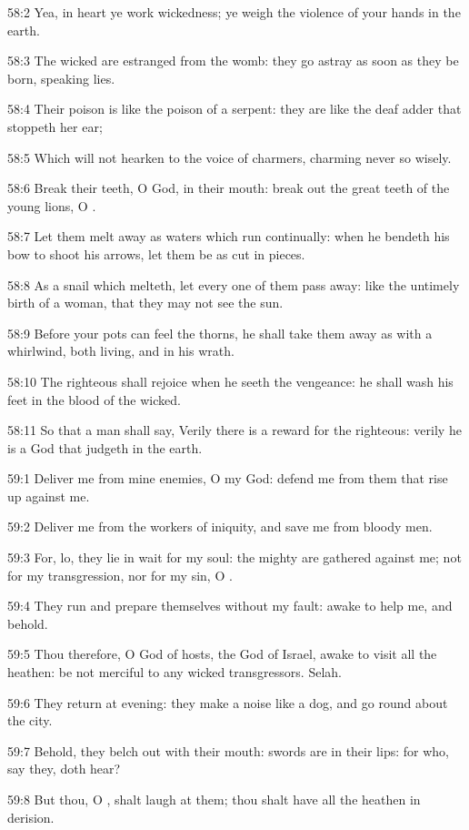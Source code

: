 58:2 Yea, in heart ye work wickedness; ye weigh the violence of your hands in the earth.

58:3 The wicked are estranged from the womb: they go astray as soon as they be born, speaking lies.

58:4 Their poison is like the poison of a serpent: they are like the deaf adder that stoppeth her ear;

58:5 Which will not hearken to the voice of charmers, charming never so wisely.

58:6 Break their teeth, O God, in their mouth: break out the great teeth of the young lions, O \LORD.

58:7 Let them melt away as waters which run continually: when he bendeth his bow to shoot his arrows, let them be as cut in pieces.

58:8 As a snail which melteth, let every one of them pass away: like the untimely birth of a woman, that they may not see the sun.

58:9 Before your pots can feel the thorns, he shall take them away as with a whirlwind, both living, and in his wrath.

58:10 The righteous shall rejoice when he seeth the vengeance: he shall wash his feet in the blood of the wicked.

58:11 So that a man shall say, Verily there is a reward for the righteous: verily he is a God that judgeth in the earth.



59:1 Deliver me from mine enemies, O my God: defend me from them that rise up against me.

59:2 Deliver me from the workers of iniquity, and save me from bloody men.

59:3 For, lo, they lie in wait for my soul: the mighty are gathered against me; not for my transgression, nor for my sin, O \LORD.

59:4 They run and prepare themselves without my fault: awake to help me, and behold.

59:5 Thou therefore, O \LORD God of hosts, the God of Israel, awake to visit all the heathen: be not merciful to any wicked transgressors.  Selah.

59:6 They return at evening: they make a noise like a dog, and go round about the city.

59:7 Behold, they belch out with their mouth: swords are in their lips: for who, say they, doth hear?

59:8 But thou, O \LORD, shalt laugh at them; thou shalt have all the heathen in derision.

